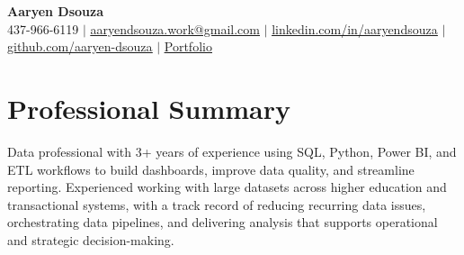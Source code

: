 \documentclass[letterpaper,10pt]{article}
\begin{document}

\begin{center}
	\textbf{\Huge Aaryen Dsouza} \\ %
	\small 437-966-6119 $|$ \href{mailto:aaryendsouza.work@gmail.com}{\underline{\phantom{/}aaryendsouza.work@gmail.com\phantom{/}}} $|$
	\href{https://www.linkedin.com/in/aaryendsouza}{\underline{\phantom{/}linkedin.com/in/aaryendsouza\phantom{/}}} $|$
	\href{https://github.com/aaryen-dsouza}{\underline{\phantom{/}github.com/aaryen-dsouza\phantom{/}}} $|$
	\href{https://aaryen.vercel.app/}{\underline{\phantom{/}Portfolio\phantom{/}}}
\end{center}

\vspace{-6pt}
\section{Professional Summary}
{\small\justifying
Data professional with 3+ years of experience using SQL, Python, Power BI, and ETL workflows to build dashboards, improve data quality, and streamline reporting. Experienced working with large datasets across higher education and transactional systems, with a track record of reducing recurring data issues, orchestrating data pipelines, and delivering analysis that supports operational and strategic decision-making.
\par}
\end{document}
